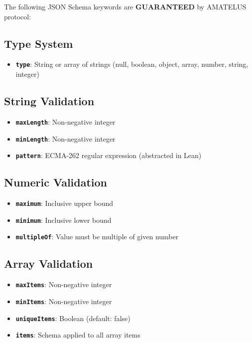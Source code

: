 The following JSON Schema keywords are \textbf{GUARANTEED} by AMATELUS protocol:

\subsection{Type System}

\begin{itemize}
  \item \textbf{\texttt{type}}: String or array of strings (null, boolean, object, array, number, string, integer)
\end{itemize}

\subsection{String Validation}

\begin{itemize}
  \item \textbf{\texttt{maxLength}}: Non-negative integer
  \item \textbf{\texttt{minLength}}: Non-negative integer
  \item \textbf{\texttt{pattern}}: ECMA-262 regular expression (abstracted in Lean)
\end{itemize}

\subsection{Numeric Validation}

\begin{itemize}
  \item \textbf{\texttt{maximum}}: Inclusive upper bound
  \item \textbf{\texttt{minimum}}: Inclusive lower bound
  \item \textbf{\texttt{multipleOf}}: Value must be multiple of given number
\end{itemize}

\subsection{Array Validation}

\begin{itemize}
  \item \textbf{\texttt{maxItems}}: Non-negative integer
  \item \textbf{\texttt{minItems}}: Non-negative integer
  \item \textbf{\texttt{uniqueItems}}: Boolean (default: false)
  \item \textbf{\texttt{items}}: Schema applied to all array items
\end{itemize}

